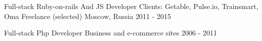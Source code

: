 \begin{cventries}
    \cvblitz
    {Full-stack Ruby-on-rails And JS Developer} %
    {Clients: Getable, Pulse.io, Trainsmart, Oma} %
    {Freelance (selected)} %
    {Moscow, Russia} %
    {2011 - 2015} %

    \cvblitz
    {Full-stack Php Developer} %
    {Business and e-commerce sites} %
    {} %
    {} %
    {2006 - 2011} %

\end{cventries}
